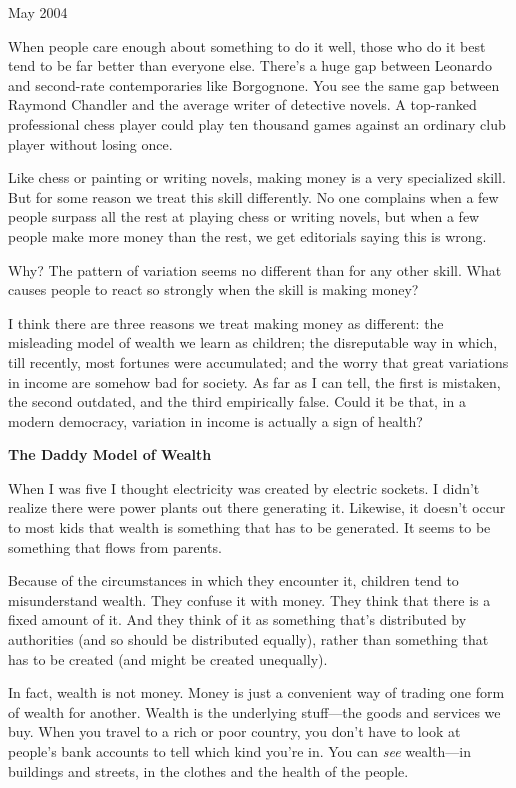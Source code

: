 May 2004

When people care enough about something to do it well, those who do it
best tend to be far better than everyone else. There's a huge gap
between Leonardo and second-rate contemporaries like Borgognone. You see
the same gap between Raymond Chandler and the average writer of
detective novels. A top-ranked professional chess player could play ten
thousand games against an ordinary club player without losing once.

Like chess or painting or writing novels, making money is a very
specialized skill. But for some reason we treat this skill differently.
No one complains when a few people surpass all the rest at playing chess
or writing novels, but when a few people make more money than the rest,
we get editorials saying this is wrong.

Why? The pattern of variation seems no different than for any other
skill. What causes people to react so strongly when the skill is making
money?

I think there are three reasons we treat making money as different: the
misleading model of wealth we learn as children; the disreputable way in
which, till recently, most fortunes were accumulated; and the worry that
great variations in income are somehow bad for society. As far as I can
tell, the first is mistaken, the second outdated, and the third
empirically false. Could it be that, in a modern democracy, variation in
income is actually a sign of health?

\textbf{The Daddy Model of Wealth}

When I was five I thought electricity was created by electric sockets. I
didn't realize there were power plants out there generating it.
Likewise, it doesn't occur to most kids that wealth is something that
has to be generated. It seems to be something that flows from parents.

Because of the circumstances in which they encounter it, children tend
to misunderstand wealth. They confuse it with money. They think that
there is a fixed amount of it. And they think of it as something that's
distributed by authorities (and so should be distributed equally),
rather than something that has to be created (and might be created
unequally).

In fact, wealth is not money. Money is just a convenient way of trading
one form of wealth for another. Wealth is the underlying stuff---the
goods and services we buy. When you travel to a rich or poor country,
you don't have to look at people's bank accounts to tell which kind
you're in. You can \emph{see} wealth---in buildings and streets, in the
clothes and the health of the people.

